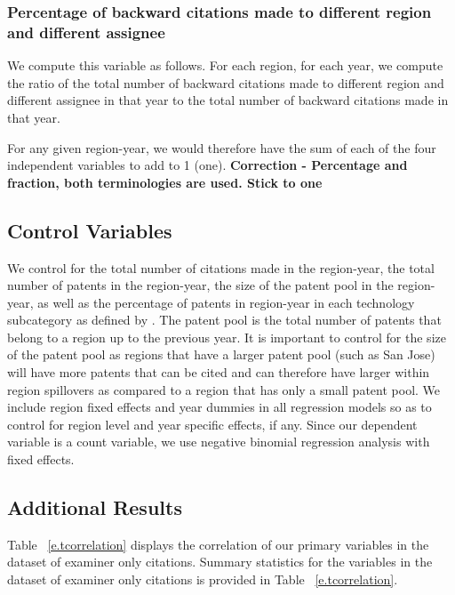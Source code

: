 \documentclass[12pt,letterpaper]{article}
\begin{document}
\subsubsection{Percentage of backward citations made to different region and different assignee}
We compute this variable as follows. For each region, for each year, we compute the ratio of the total number of backward citations made to different region and different assignee in that year to the total number of backward citations made in that year.\par

For any given region-year, we would therefore have the sum of each of the four independent variables to add to 1 (one). \textbf{Correction - Percentage and fraction, both terminologies are used. Stick to one}

\subsection{Control Variables}
We control for the total number of citations made in the region-year, the total number of patents in the region-year, the size of the patent pool in the region-year, as well as the percentage of patents in region-year in each technology subcategory as defined by \cite*{Hall2001a}. The patent pool is the total number of patents that belong to a region up to the previous year. It is important to control for the size of the patent pool as  regions that have a larger patent pool (such as San Jose) will have more patents that can be cited and can therefore have larger within region spillovers as compared to a region that has only a small patent pool. We include region fixed effects and year dummies in all regression models so as to control for region level and year specific effects, if any. Since our dependent variable is a count variable, we use negative binomial regression analysis with fixed effects. \par



\subsection{Additional Results}
Table ~\ref{e.tcorrelation} displays the correlation of our primary variables in the dataset of examiner only citations. Summary statistics for the variables in the dataset of examiner only citations is provided in Table ~\ref{e.tcorrelation}.


%
\end{document}

